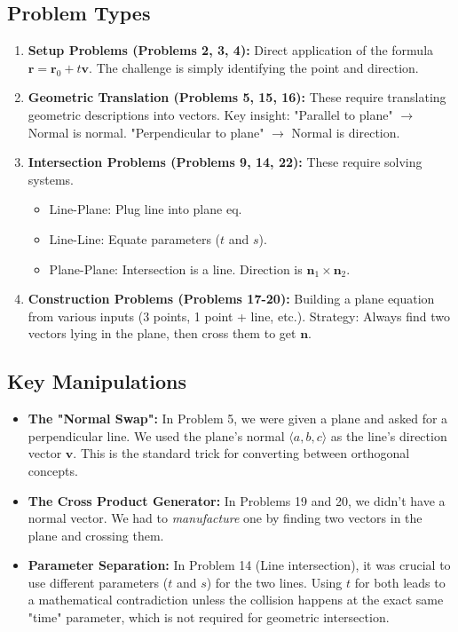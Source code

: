 \documentclass[11pt]{article}
\begin{document}
\subsection{Problem Types}
\begin{enumerate}
    \item \textbf{Setup Problems (Problems 2, 3, 4):} Direct application of the formula $\mathbf{r} = \mathbf{r}_0 + t\mathbf{v}$. The challenge is simply identifying the point and direction.
    \item \textbf{Geometric Translation (Problems 5, 15, 16):} These require translating geometric descriptions into vectors. Key insight: "Parallel to plane" $\rightarrow$ Normal is normal. "Perpendicular to plane" $\rightarrow$ Normal is direction.
    \item \textbf{Intersection Problems (Problems 9, 14, 22):} These require solving systems.
    \begin{itemize}
        \item Line-Plane: Plug line into plane eq.
        \item Line-Line: Equate parameters ($t$ and $s$).
        \item Plane-Plane: Intersection is a line. Direction is $\mathbf{n}_1 \times \mathbf{n}_2$.
    \end{itemize}
    \item \textbf{Construction Problems (Problems 17-20):} Building a plane equation from various inputs (3 points, 1 point + line, etc.). Strategy: Always find two vectors lying in the plane, then cross them to get $\mathbf{n}$.
\end{enumerate}

\subsection{Key Manipulations}
\begin{itemize}
    \item \textbf{The "Normal Swap":} In Problem 5, we were given a plane and asked for a perpendicular line. We used the plane's normal $\langle a,b,c \rangle$ as the line's direction vector $\mathbf{v}$. This is the standard trick for converting between orthogonal concepts.
    \item \textbf{The Cross Product Generator:} In Problems 19 and 20, we didn't have a normal vector. We had to \textit{manufacture} one by finding two vectors in the plane and crossing them.
    \item \textbf{Parameter Separation:} In Problem 14 (Line intersection), it was crucial to use different parameters ($t$ and $s$) for the two lines. Using $t$ for both leads to a mathematical contradiction unless the collision happens at the exact same "time" parameter, which is not required for geometric intersection.
\end{itemize}
\end{document}
